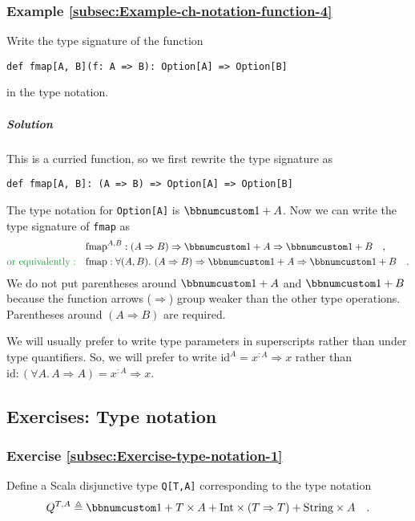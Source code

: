 \subsubsection{Example \label{subsec:Example-ch-notation-function-4}\ref{subsec:Example-ch-notation-function-4}}

Write the type signature of the function
\begin{lstlisting}
def fmap[A, B](f: A => B): Option[A] => Option[B]
\end{lstlisting}
in the type notation.

\subparagraph{Solution}

This is a curried function, so we first rewrite the type signature
as
\begin{lstlisting}
def fmap[A, B]: (A => B) => Option[A] => Option[B]
\end{lstlisting}
The type notation for \lstinline!Option[A]! is $\bbnum 1+A$. Now
we can write the type signature of \lstinline!fmap! as
\begin{align*}
 & \text{fmap}^{A,B}:\left(A\Rightarrow B\right)\Rightarrow\bbnum 1+A\Rightarrow\bbnum 1+B\quad,\\
{\color{greenunder}\text{or equivalently}:}\quad & \text{fmap}:\forall(A,B).\,\left(A\Rightarrow B\right)\Rightarrow\bbnum 1+A\Rightarrow\bbnum 1+B\quad.
\end{align*}
We do not put parentheses around $\bbnum 1+A$ and $\bbnum 1+B$ because
the function arrows ($\Rightarrow$) group weaker than the other type
operations. Parentheses around $\left(A\Rightarrow B\right)$ are
required.

We will usually prefer to write type parameters in superscripts rather
than under type quantifiers. So, we will prefer to write $\text{id}^{A}=x^{:A}\Rightarrow x$
rather than $\text{id}:(\forall A.\,A\Rightarrow A)=x^{:A}\Rightarrow x$.

\subsection{Exercises: Type notation}

\subsubsection{Exercise \label{subsec:Exercise-type-notation-1}\ref{subsec:Exercise-type-notation-1}}

Define a Scala disjunctive type \lstinline!Q[T,A]! corresponding
to the type notation
\[
Q^{T,A}\triangleq\bbnum 1+T\times A+\text{Int}\times(T\Rightarrow T)+\text{String}\times A\quad.
\]



